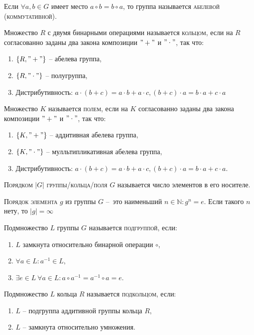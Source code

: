 \documentclass{article}
\begin{document}
Если $\forall a,b\in G$ имеет место $a\circ b=b\circ a$, то группа называется \textsc{абелевой (коммутативной)}.

Множество $R$ с двумя бинарными операциями называется \textsc{кольцом}, если на $R$ согласованно заданы два закона композиции $"+"$ и $"\cdot"$, так что:
\begin{enumerate}
    \item $\{ R, "+"\}$ – абелева группа,
    \item $\{ R, "\cdot"\}$ – полугруппа,
    \item Дистрибутивность: $a\cdot(b+c)=a\cdot b+a\cdot c, (b+c)\cdot a=b\cdot a+c\cdot a$
\end{enumerate}

Множество $K$ называется \textsc{полем}, если на $K$ согласованно заданы два закона композиции $"+"$ и $"\cdot"$, так что:
\begin{enumerate}
    \item $\{K, "+"\}$ – аддитивная абелева группа,
    \item $\{K, "\cdot"\}$ – мулльтипликативная абелева группа,
    \item Дистрибутивность: $a\cdot(b+c)=a\cdot b+a\cdot c, (b+c)\cdot a=b\cdot a+c\cdot a.$
\end{enumerate}

\textsc{Порядком {$|G|$} группы/кольца/поля {$G$}} называется число элементов в его носителе. 

\textsc{Порядок элемента {$g$}} из группы $G$ – это наименьший $n\in \mathbb{N}\colon g^n=e.$ Если такого $n$ нету, то $|g|=\infty$

Подмножество $L$ группы $G$ называется \textsc{подгруппой}, если:
\begin{enumerate}
    \item $L$ замкнута относительно бинарной операции $\circ$,
    \item $\forall a\in L\colon a^{-1}\in L$,
    \item $\exists e\in L\ \forall a\in L\colon a\circ a^{-1}=a^{-1}\circ a=e$.
\end{enumerate}

Подмножество $L$ кольца $R$ называется \textsc{подкольцом}, если:
\begin{enumerate}
    \item $L$ – подгруппа аддитивной группы кольца $R$,
    \item $L$ – замкнута относительно умножения.
\end{enumerate}
\end{document}
